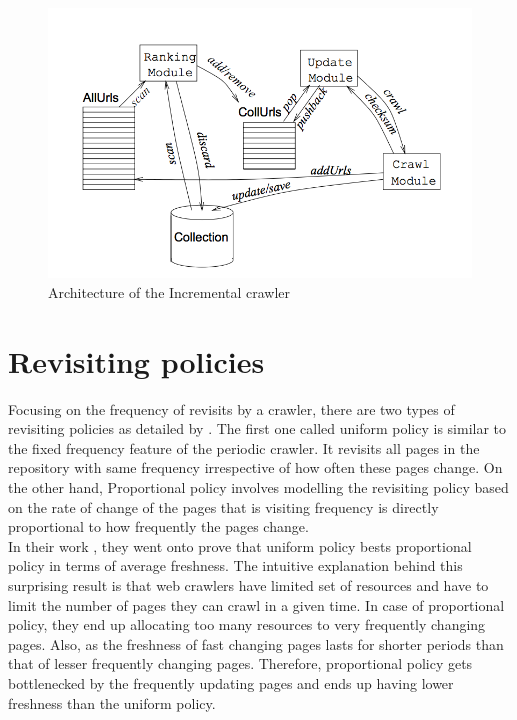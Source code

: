 \documentclass[a4paper, 11pt]{article} %
\begin{document}
\begin{figure}[h] %
\begin{center}
\includegraphics[width=1\textwidth]{incremental.png}
\end{center}
\caption{Architecture of the Incremental crawler}
\end{figure}

\section{Revisiting policies}

Focusing on the frequency of revisits by a crawler, there are two types of revisiting policies as detailed by \cite{cho2003effective}. The first one called uniform policy is similar to the fixed frequency feature of the periodic crawler. It revisits all pages in the repository with same frequency irrespective of how often these pages change. On the other hand, Proportional policy involves modelling the revisiting policy based on the rate of change of the pages that is visiting frequency is directly proportional to how frequently the pages change. \\

In their work \cite{cho2003estimating}, they went onto prove that uniform policy bests proportional policy in terms of average freshness. The intuitive explanation behind this surprising result is that web crawlers have limited set of resources and have to limit the number of pages they can crawl in a given time. In case of proportional policy, they end up allocating too many resources to very frequently changing pages. Also, as the freshness of fast changing pages lasts for shorter periods than that of lesser frequently changing pages. Therefore, proportional policy gets bottlenecked by the frequently updating pages and ends up having lower freshness than the uniform policy.
\end{document}
